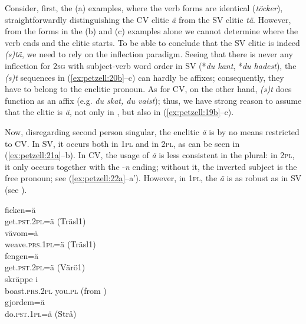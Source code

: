 \documentclass[output=paper,colorlinks,citecolor=brown,draft,draftmode]{langscibook}
\begin{document}
Consider, first, the (a) examples, where the verb forms are identical (\textit{töcker}), straightforwardly distinguishing the CV clitic \textit{ä} from the SV clitic \textit{tä}. However, from the forms in the (b) and (c) examples alone we cannot determine where the verb ends and the clitic starts. To be able to conclude that the SV clitic is indeed \textit{(s)tä}, we need to rely on the inflection paradigm. Seeing that there is never any inflection for 2\textsc{sg} with subject-verb word order in SV (*\textit{du kant}, *\textit{du hadest}), the \textit{(s)t} sequences in (\ref{ex:petzell:20b}–c) can hardly be affixes; consequently, they have to belong to the enclitic pronoun. As for CV, on the other hand, \textit{(s)t} does function as an affix (e.g. \textit{du skat, du vaist}); thus, we have strong reason to assume that the clitic is \textit{ä}, not only in , but also in (\ref{ex:petzell:19b}–c).



Now, disregarding second person singular, the enclitic \textit{ä} is by no means restricted to CV. In SV, it occurs both in 1\textsc{pl} and in 2\textsc{pl,} as can be seen in (\ref{ex:petzell:21a}–b). In CV, the usage of \textit{ä} is less consistent in the plural: in 2\textsc{pl}, it only occurs together with the -\textit{n} ending; without it, the inverted subject is the free pronoun; see (\ref{ex:petzell:22a}–a′). However, in 1\textsc{pl}, the \textit{ä} is as robust as in SV (see ).


\ea\label{ex:petzell:21}
\ea\label{ex:petzell:21a}
\gll ficken=ä \\
    get.\textsc{pst}.2\textsc{pl}=ä (Träsl1)  \\
\ex\label{ex:petzell:21b}
\gll vävom=ä   \\
    weave.\textsc{prs}.1\textsc{pl}=ä (Träsl1)\\
\z
\ex\label{ex:petzell:22}
\ea\label{ex:petzell:22a}
\gll fengen=ä \\
    get.\textsc{pst}.2\textsc{pl}=ä (Värö1)  \\
\gll skräppe      i\\
    boast.\textsc{prs}.2\textsc{pl}   you.\textsc{pl} (from \citealt{Lindberg1927})  \\
\ex\label{ex:petzell:22b}
\gll gjordem=ä   \\
    do.\textsc{pst}.1\textsc{pl}=ä (Strå)\\
\z
\z
\end{document}

